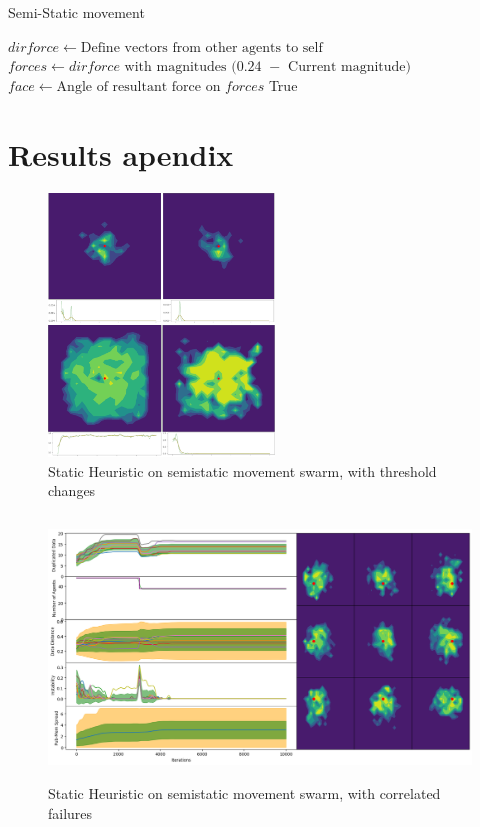 \documentclass{UoYCSproject}
\begin{document}
\begin{algorithm}
\caption{Semi-Static movement}
\label{semistaticmove}
\begin{algorithmic}[1]
\State $dirforce \gets \text{Define vectors from other agents to self}$
\State $forces \gets \text{$dirforce$ with magnitudes $($0.24 $-$ Current magnitude$)$}$
\State
\State {}
\State
\State $face \gets \text{Angle of resultant force on $forces$}$
\State {}
\State
\State \Return True
\EndProcedure
\end{algorithmic}
\end{algorithm}



\chapter{Results apendix}

\begin{figure}[htb]
\label{fig:Threshold_Changes}
\begin{center}
\centering
\includegraphics[height=7cm]{"./Static_Heuristic/Threshold_Changes.png"}
\caption{Static Heuristic on semi\-static movement swarm, with threshold changes}
\end{center}
\end{figure}

\begin{figure}[htb]
\label{fig:static_movement_con}
\begin{center}
\centering
\includegraphics[height=7cm]{"./Static_Heuristic/Static_Movement_concurrent.png"}
\caption{Static Heuristic on semi\-static movement swarm, with correlated failures}
\end{center}
\end{figure}
\end{document}
